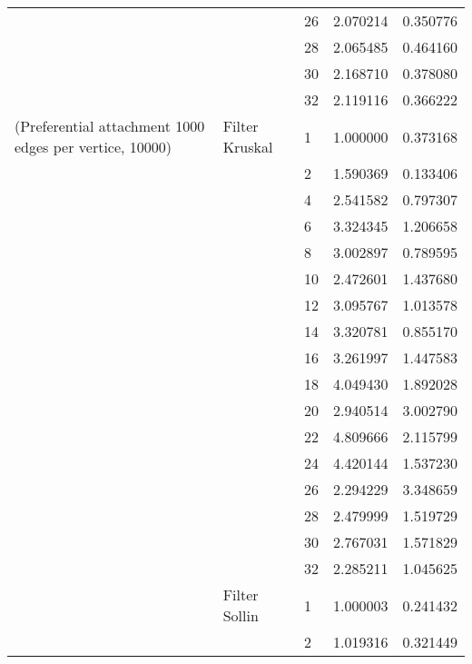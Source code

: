 \begin{tabular}{lllrr}
                      &                     & 26 &  2.070214 &  0.350776 \\
                      &                     & 28 &  2.065485 &  0.464160 \\
                      &                     & 30 &  2.168710 &  0.378080 \\
                      &                     & 32 &  2.119116 &  0.366222 \\
(Preferential attachment 1000 edges per vertice, 10000) & Filter Kruskal & 1  &  1.000000 &  0.373168 \\
                      &                     & 2  &  1.590369 &  0.133406 \\
                      &                     & 4  &  2.541582 &  0.797307 \\
                      &                     & 6  &  3.324345 &  1.206658 \\
                      &                     & 8  &  3.002897 &  0.789595 \\
                      &                     & 10 &  2.472601 &  1.437680 \\
                      &                     & 12 &  3.095767 &  1.013578 \\
                      &                     & 14 &  3.320781 &  0.855170 \\
                      &                     & 16 &  3.261997 &  1.447583 \\
                      &                     & 18 &  4.049430 &  1.892028 \\
                      &                     & 20 &  2.940514 &  3.002790 \\
                      &                     & 22 &  4.809666 &  2.115799 \\
                      &                     & 24 &  4.420144 &  1.537230 \\
                      &                     & 26 &  2.294229 &  3.348659 \\
                      &                     & 28 &  2.479999 &  1.519729 \\
                      &                     & 30 &  2.767031 &  1.571829 \\
                      &                     & 32 &  2.285211 &  1.045625 \\
                      & Filter Sollin & 1  &  1.000003 &  0.241432 \\
                      &                     & 2  &  1.019316 &  0.321449 \\

\end{tabular}
